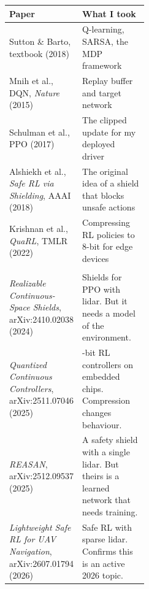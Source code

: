 \documentclass[10pt,a4paper]{extarticle}
\begin{document}
\begin{tabularx}{\linewidth}{@{}>{\raggedright\arraybackslash}p{0.45\linewidth}>{\raggedright\arraybackslash}X@{}}
\toprule
\textbf{Paper} & \textbf{What I took}\\\midrule
Sutton \& Barto, textbook (2018) & Q-learning, SARSA, the MDP framework\\
Mnih et al., DQN, \emph{Nature} (2015) & Replay buffer and target network\\
Schulman et al., PPO (2017) & The clipped update for my deployed driver\\
Alshiekh et al., \emph{Safe RL via Shielding}, AAAI (2018) & The original idea of a shield that blocks unsafe actions\\
Krishnan et al., \emph{QuaRL}, TMLR (2022) & Compressing RL policies to 8-bit for edge devices\\\midrule
\multicolumn{2}{@{}l}{\textbf{Latest research (2024--2026)}}\\\midrule
\emph{Realizable Continuous-Space Shields}, arXiv:2410.02038 (2024) & Shields for PPO with lidar. But it needs a model of the environment.\\
\emph{Quantized Continuous Controllers}, arXiv:2511.07046 (2025) & 8-bit RL controllers on embedded chips. Compression changes behaviour.\\
\emph{REASAN}, arXiv:2512.09537 (2025) & A safety shield with a single lidar. But theirs is a learned network that needs training.\\
\emph{Lightweight Safe RL for UAV Navigation}, arXiv:2607.01794 (2026) & Safe RL with sparse lidar. Confirms this is an active 2026 topic.\\\bottomrule
\end{tabularx}
\vspace{4pt}

\end{document}

